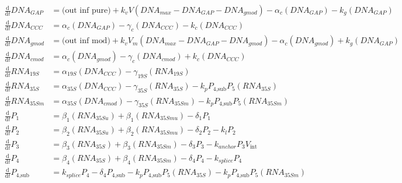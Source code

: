 \documentclass[fontsize=9pt,letter]{scrartcl}
\numberwithin{equation}{section} %
\numberwithin{figure}{section} %
\numberwithin{table}{section} %
\begin{document}
\begin{align}
\frac{\mathrm{d}}{\mathrm{d} t} DNA_{GAP} &= \text{(out inf pure)} + k_v V (DNA_{max} - DNA_{GAP} - DNA_{gmod}) - \alpha_c (DNA_{GAP}) - k_g (DNA_{GAP}) \\
%
\frac{\mathrm{d}}{\mathrm{d} t} DNA_{CCC} &= \alpha_c (DNA_{GAP}) - \gamma_c (DNA_{CCC}) - k_c (DNA_{CCC}) \\
%
\frac{\mathrm{d}}{\mathrm{d} t} DNA_{gmod} &= \text{(out inf mod)} + k_v V_m (DNA_{max} - DNA_{GAP} - DNA_{gmod}) - \alpha_c (DNA_{gmod}) + k_g (DNA_{GAP}) \\
\frac{\mathrm{d}}{\mathrm{d} t} DNA_{cmod} &= \alpha_c (DNA_{gmod}) - \gamma_c (DNA_{cmod}) + k_c (DNA_{CCC}) \\
\frac{\mathrm{d}}{\mathrm{d} t} RNA_{19S} &= \alpha_{19S} (DNA_{CCC}) - \gamma_{19S} (RNA_{19S}) \\
%
\frac{\mathrm{d}}{\mathrm{d} t} RNA_{35S} &= \alpha_{35S} (DNA_{CCC}) - \gamma_{35S} (RNA_{35S}) -  k_p P_{4 \text{,sub}} P_5 (RNA_{35S}) \\
%
\frac{\mathrm{d}}{\mathrm{d} t} RNA_{35Sm} &= \alpha_{35S} (DNA_{cmod}) - \gamma_{35S} (RNA_{35Sm}) -  k_p P_{4 \text{,sub}} P_5 (RNA_{35Sm}) \\
%
\frac{\mathrm{d}}{\mathrm{d} t} P_1 &= \beta_1 (RNA_{35Su}) + \beta_1 (RNA_{35Smu}) - \delta_1 P_1 \\
%
\frac{\mathrm{d}}{\mathrm{d} t} P_2 &= \beta_2 (RNA_{35Su}) + \beta_2 (RNA_{35Smu}) - \delta_2 P_2 - k_l P_2 \\
%
\frac{\mathrm{d}}{\mathrm{d} t} P_3 &= \beta_3 (RNA_{35S}) + \beta_3 (RNA_{35Sm}) - \delta_3 P_3 - k_{anchor} P_3 V_{\text{int}} \\
%
\frac{\mathrm{d}}{\mathrm{d} t} P_4 &= \beta_4 (RNA_{35S}) + \beta_4 (RNA_{35Sm}) - \delta_4 P_4 - k_{splice} P_4 \\
%
\frac{\mathrm{d}}{\mathrm{d} t} P_{4 \text{,sub}} &= k_{splice} P_4 - \delta_4 P_{4 \text{,sub}} - k_p P_{4 \text{,sub}} P_5 (RNA_{35S}) - k_p P_{4 \text{,sub}} P_5 (RNA_{35Sm}) \\

\end{align}
\end{document}
